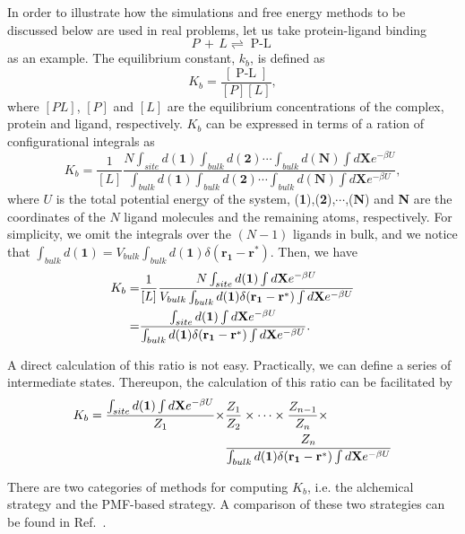 In order to illustrate how the simulations and free energy methods to be discussed below are used in real problems, let us take protein-ligand binding
\begin{equation}
P\,+\,L\rightleftharpoons \operatorname{P-L}
\end{equation}
as an example. The equilibrium constant, $k_b$, is defined as
\begin{equation}
K_b=\frac{[\operatorname{P-L}]}{[P][L]},
\end{equation} 
where $[PL]$, $[P]$ and $[L]$ are the equilibrium concentrations of the complex, protein and ligand, respectively. $K_b$ can be expressed in terms of a ration of configurational integrals as
\begin{equation}
K_b=\frac{1}{[L]}\frac{N\int_{site}d(\mathbf{1})\int_{bulk}d(\mathbf{2})\cdots\int_{bulk}d(\mathbf{N})\int d\mathbf{X}e^{-\beta U}}{\int_{bulk}d(\mathbf{1})\int_{bulk}d(\mathbf{2})\cdots\int_{bulk}d(\mathbf{N})\int d\mathbf{X}e^{-\beta U}},
\end{equation}
where $U$ is the total potential energy of the system, (\textbf{1}),(\textbf{2}),$\cdots$,(\textbf{N}) and \textbf{N} are the coordinates of the $N$ ligand molecules and the remaining atoms, respectively. For simplicity, we omit the integrals over the $(N-1)$ ligands in bulk, and we notice that $\int_{bulk}d(\mathbf{1})=V_{bulk}\int_{bulk}d(\mathbf{1})\delta(\mathbf{r_1}-\mathbf{r}^*)$. Then, we have
\begin{align}
   K_b=&\frac{1}{[L]}\frac{N\int_{site}d(\mathbf{1})\int d\mathbf{X}e^{-\beta U}}{V_{bulk}\int_{bulk}d(\mathbf{1})\delta(\mathbf{r_1}-\mathbf{r}^*)\int d\mathbf{X}e^{-\beta U}}\notag\\
      =&\frac{\int_{site}d(\mathbf{1})\int d\mathbf{X}e^{-\beta U}}{\int_{bulk}d(\mathbf{1})\delta(\mathbf{r_1}-\mathbf{r}^*)\int d\mathbf{X}e^{-\beta U}}.
\end{align}

A direct calculation of this ratio is not easy. Practically, we can define a series of intermediate states. Thereupon, the calculation of this ratio can be facilitated by
\begin{align}
K_b=\frac{\int_{site}d(\mathbf{1})\int d\mathbf{X}e^{-\beta U}}{Z_1}\times&\frac{Z_1}{Z_2}\times\cdots\times\frac{Z_{n-1}}{Z_n}\times\notag\\ &\frac{Z_n}{\int_{bulk}d(\mathbf{1})\delta(\mathbf{r_1}-\mathbf{r}^*)\int d\mathbf{X}e^{-\beta U}}
\end{align}

There are two categories of methods for computing $K_b$, i.e. the alchemical strategy\cite{DengJCTC2006} and the PMF-based strategy\cite{WooPNAS2005}. A comparison of these two strategies can be found in Ref.~\cite{GumbartJCTC2013}.